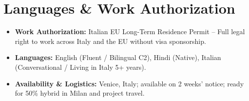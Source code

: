 \documentclass[10pt, a4paper]{article}
\begin{document}
\section*{Languages \& Work Authorization}
\begin{itemize}
    \item \textbf{Work Authorization:} Italian EU Long-Term Residence Permit -- Full legal right to work across Italy and the EU without visa sponsorship.
    \item \textbf{Languages:} English (Fluent / Bilingual C2), Hindi (Native), Italian (Conversational / Living in Italy 5+ years).
    \item \textbf{Availability \& Logistics:} Venice, Italy; available on 2 weeks' notice; ready for 50\% hybrid in Milan and project travel.
\end{itemize}
\end{document}
